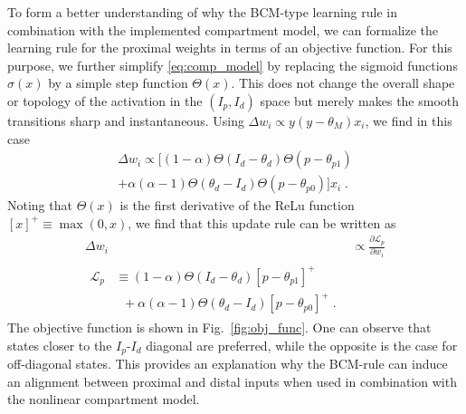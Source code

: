 \documentclass[utf8]{frontiersSCNS} %
\begin{document}
To form a better understanding of why the BCM-type learning rule
in combination with the implemented compartment model, we can formalize
the learning rule for the proximal weights in terms of an objective function.
For this purpose, we further simplify \eqref{eq:comp_model} by replacing
the sigmoid functions $\sigma(x)$ by a simple step function $\Theta(x)$. 
This does not change the overall shape or topology of the activation
in the $(I_p,I_d)$ space but merely makes the smooth transitions sharp
and instantaneous. Using $\Delta w_i \propto y\left(y - \theta_M \right) x_i$,
we find in this case
\begin{equation}
\begin{split}
\Delta w_i \propto [ (1-\alpha) \Theta(I_d - \theta_{d})\Theta(p-\theta_{p1})
\\ + \alpha (\alpha - 1)\Theta(\theta_{d} - I_d)\Theta(p-\theta_{p0}) ]x_i \; .
\end{split}
\end{equation}
Noting that $\Theta(x)$ is the first derivative of the ReLu function $[x]^+ \equiv \max(0,x)$,
we find that this update rule can be written as
\begin{align}
\Delta w_i &\propto \frac{\partial \mathcal{L}_p}{\partial w_i}\\
\begin{split}
\mathcal{L}_p &\equiv (1-\alpha) \Theta(I_d - \theta_{d})[p-\theta_{p1}]^+\\
&\;\; + \alpha (\alpha - 1)\Theta(\theta_{d} - I_d)[p-\theta_{p0}]^+ \; .
\end{split}\label{eq:obj_func}
\end{align}
The objective function is shown in Fig.~\ref{fig:obj_func}. 
One can observe that states closer to the $I_p$-$I_d$ diagonal 
are preferred, while the opposite is the case for off-diagonal states. 
This provides an explanation why the BCM-rule can induce 
an alignment between proximal and distal inputs when used 
in combination with the nonlinear compartment model. 
\end{document}
